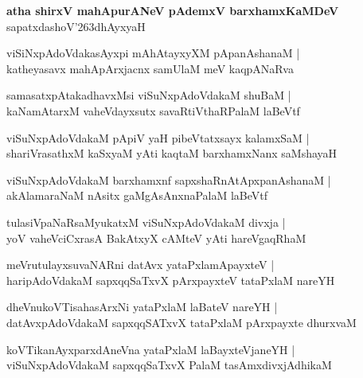 \begin{center}
\textbf{\large atha shirxV mahApurANeV pAdemxV barxhamxKaMDeV}\\
sapatxdashoV\char'263dhAyxyaH
\end{center}

\setcounter{shloka}{0}
\begin{shloka}
viSiNxpAdoVdakasAyxpi mAhAtayxyXM pApanAshanaM |\\
katheyasavx mahApArxjacnx samUlaM meV kaqpANaRva
\end{shloka}

\begin{shloka}
samasatxpAtakadhavxMsi viSuNxpAdoVdakaM shuBaM |\\
kaNamAtarxM vaheVdayxsutx savaRtiVthaRPalaM laBeVtf
\end{shloka}

\begin{shloka}
viSuNxpAdoVdakaM pApiV yaH pibeVtatxsayx kalamxSaM |\\
shariVrasathxM kaSxyaM yAti kaqtaM barxhamxNanx saMshayaH 
\end{shloka}

\begin{shloka}
viSuNxpAdoVdakaM barxhamxnf sapxshaRnAtApxpanAshanaM |\\
akAlamaraNaM nAsitx gaMgAsAnxnaPalaM laBeVtf
\end{shloka}

\begin{shloka}
tulasiVpaNaRsaMyukatxM viSuNxpAdoVdakaM divxja |\\
yoV vaheVciCxrasA BakAtxyX cAMteV yAti hareVgaqRhaM 
\end{shloka}

\begin{shloka}
meVrutulayxsuvaNARni datAvx yataPxlamApayxteV |\\
haripAdoVdakaM sapxqqSaTxvX pArxpayxteV tataPxlaM nareYH
\end{shloka}

\begin{shloka}
dheVnukoVTisahasArxNi yataPxlaM laBateV nareYH |\\
datAvxpAdoVdakaM sapxqqSATxvX tataPxlaM pArxpayxte dhurxvaM
\end{shloka}

\begin{shloka}
koVTikanAyxparxdAneVna yataPxlaM laBayxteVjaneYH |\\
viSuNxpAdoVdakaM sapxqqSaTxvX PalaM tasAmxdivxjAdhikaM
\end{shloka}

